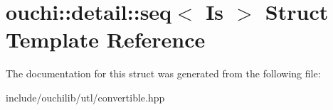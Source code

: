 \hypertarget{structouchi_1_1detail_1_1seq}{}\section{ouchi\+::detail\+::seq$<$ Is $>$ Struct Template Reference}
\label{structouchi_1_1detail_1_1seq}


The documentation for this struct was generated from the following file\+:\begin{DoxyCompactItemize}
\item 
include/ouchilib/utl/convertible.\+hpp\end{DoxyCompactItemize}
